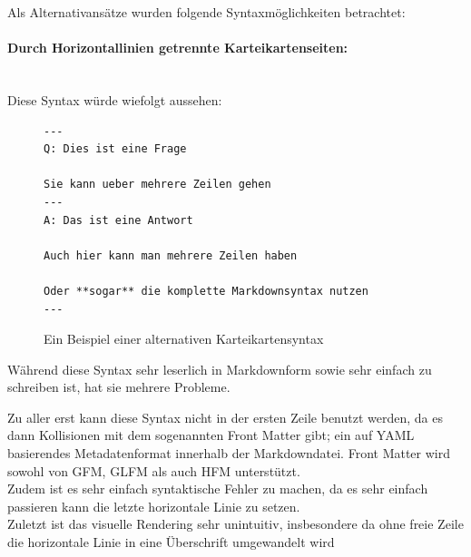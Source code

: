 \documentclass[ngerman]{article}
\begin{document}
Als Alternativansätze wurden folgende Syntaxmöglichkeiten betrachtet:

\paragraph{Durch Horizontallinien getrennte Karteikartenseiten:}~\\
Diese Syntax würde wiefolgt aussehen:
\begin{figure}[H]
\centering
\begin{lstlisting}
---
Q: Dies ist eine Frage

Sie kann ueber mehrere Zeilen gehen
---
A: Das ist eine Antwort

Auch hier kann man mehrere Zeilen haben

Oder **sogar** die komplette Markdownsyntax nutzen
---
\end{lstlisting}
  \caption{Ein Beispiel einer alternativen Karteikartensyntax}
\end{figure}

Während diese Syntax sehr leserlich in Markdownform sowie sehr einfach zu schreiben ist, hat sie mehrere Probleme.

Zu aller erst kann diese Syntax nicht in der ersten Zeile benutzt werden, da es dann Kollisionen mit dem sogenannten Front Matter gibt; ein auf YAML basierendes Metadatenformat innerhalb der Markdowndatei. Front Matter wird sowohl von GFM, GLFM als auch HFM unterstützt.\\

Zudem ist es sehr einfach syntaktische Fehler zu machen, da es sehr einfach passieren kann die letzte horizontale Linie zu setzen.\\

Zuletzt ist das visuelle Rendering sehr unintuitiv, insbesondere da ohne freie Zeile die horizontale Linie in eine Überschrift umgewandelt wird
\end{document}

